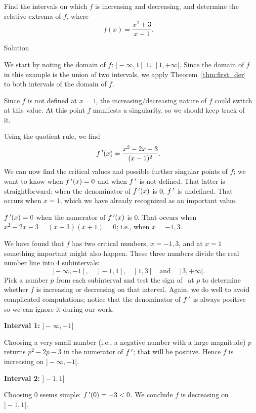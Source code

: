 \begin{example}
\label{ex_incr2}
Find the intervals on which $f$ is increasing and decreasing, and determine the relative extrema of $f$,  where 
$$f(x) = \frac{x^2+3}{x-1}.$$

Solution 

We start by noting the domain of $f$: $]-\infty,1[ \, \cup \, ]1,+\infty[$. Since the domain of $f$ in this example is the union of two intervals, we apply Theorem~\ref{thm:first_der} to both intervals of the domain of $f$. 

Since $f$ is not defined at $x=1$, the increasing/decreasing nature of $f$ could switch at this value. At this point $f$ manifests a singularity, so we should keep track of it. 

Using the quotient rule, we find
$$f\,'(x) = \frac{x^2-2x-3}{(x-1)^2}.$$
We can now find the critical values and possible further singular points of $f$; we want to know when $f\,'(x)=0$ and when $f\,'$ is not defined. That latter is straightforward: when the denominator of $f\,'(x)$ is 0, $f\,'$ is undefined. That occurs when $x=1$, which we have already recognized as an important value.


$f\,'(x)=0$ when the numerator of $f\,'(x)$ is 0. That occurs when $x^2-2x-3 = (x-3)(x+1) = 0$; i.e., when $x=-1,3$. 

We have found that $f$ has two critical numbers, $x=-1,3$, and at $x=1$ something important might also happen. These three numbers divide the real number line into 4 subintervals: 
$$]-\infty,-1[, \quad ]-1, 1[, \quad ]1,3[ \quad \text{and} \quad ]3,+\infty[.$$ Pick a number $p$ from each subinterval and test the sign of \fp\ at $p$ to determine whether $f$ is increasing or decreasing on that interval. Again, we do well to avoid complicated computations; notice that the denominator of $f\,'$ is always positive so we can ignore it during our work.

\begin{description}
\item \textbf{Interval 1:} $]-\infty,-1[$

Choosing a very small number (i.e., a negative number with a large magnitude) $p$ returns $p^2-2p-3$ in the numerator of $f\,'$; that will be positive. Hence $f$ is increasing on $]-\infty,-1[$.

\item \textbf{Interval 2:} $]-1,1[$

Choosing 0 seems simple: $f\,'(0)=-3<0$. We conclude $f$ is decreasing on $]-1,1[$.


\end{description}
\end{example}
